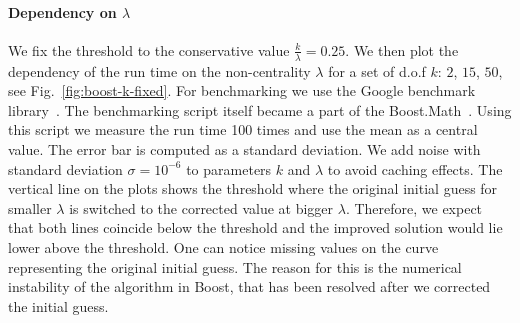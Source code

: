\documentclass{amsart}
\numberwithin{equation}{section}
\begin{document}
\paragraph{Dependency on $\lambda$} We fix the threshold to the conservative value  $\frac{k}{\lambda} = 0.25$. We then plot the dependency of the run time on the non-centrality $\lambda$ for a set of d.o.f $k$: $2$, $15$, $50$, see Fig.~\ref{fig:boost-k-fixed}. For benchmarking we use the Google benchmark library~\cite{gbenchmark}. The benchmarking script itself became a part of the Boost.Math~\cite{gbench-script}. Using this script we measure the run time 100 times and use the mean as a central value. The error bar is computed as a standard deviation. We add noise with standard deviation $\sigma = 10^{-6}$ to parameters $k$ and $\lambda$ to avoid caching effects. The vertical line on the plots shows the threshold where the original initial guess for smaller $\lambda$ is switched to the corrected value at bigger $\lambda$. Therefore, we expect that both lines coincide below the threshold and the improved solution would lie lower above the threshold. One can notice missing values on the curve representing the original initial guess. The reason for this is the numerical instability of the algorithm in Boost, that has been resolved after we corrected the initial guess.
%
\end{document}
